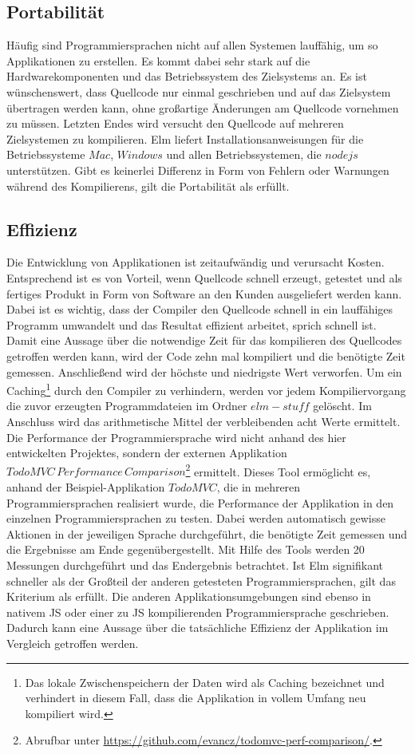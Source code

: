 \subsection{Portabilität}
\label{sec:muster_portabilitaet}
Häufig sind Programmiersprachen nicht auf allen Systemen lauffähig, um so Applikationen zu erstellen. Es kommt dabei sehr stark auf die Hardwarekomponenten und das Betriebssystem des Zielsystems an. Es ist wünschenswert, dass Quellcode nur einmal geschrieben und auf das Zielsystem übertragen werden kann, ohne großartige Änderungen am Quellcode vornehmen zu müssen. Letzten Endes wird versucht den Quellcode auf mehreren Zielsystemen zu kompilieren. Elm liefert Installationsanweisungen für die Betriebssysteme $Mac$, $Windows$ und allen Betriebssystemen, die $nodejs$ unterstützen. Gibt es keinerlei Differenz in Form von Fehlern oder Warnungen während des Kompilierens, gilt die Portabilität als erfüllt.


\subsection{Effizienz}
\label{sec:muster_effizienz}
Die Entwicklung von Applikationen ist zeitaufwändig und verursacht Kosten. Entsprechend ist es von Vorteil, wenn Quellcode schnell erzeugt, getestet und als fertiges Produkt in Form von Software an den Kunden ausgeliefert werden kann. Dabei ist es wichtig, dass der Compiler den Quellcode schnell in ein lauffähiges Programm umwandelt und das Resultat effizient arbeitet, sprich schnell ist. Damit eine Aussage über die notwendige Zeit für das kompilieren des Quellcodes getroffen werden kann, wird der Code zehn mal kompiliert und die benötigte Zeit gemessen. Anschließend wird der höchste und niedrigste Wert verworfen. Um ein Caching\footnote{Das lokale Zwischenspeichern der Daten wird als Caching bezeichnet und verhindert in diesem Fall, dass die Applikation in vollem Umfang neu kompiliert wird.} durch den Compiler zu verhindern, werden vor jedem Kompiliervorgang die zuvor erzeugten Programmdateien im Ordner $elm-stuff$ gelöscht. Im Anschluss wird das arithmetische Mittel der verbleibenden acht Werte ermittelt.
Die Performance der Programmiersprache wird nicht anhand des hier entwickelten Projektes, sondern der externen Applikation $TodoMVC\,Performance\,Comparison$\footnote{Abrufbar unter \url{https://github.com/evancz/todomvc-perf-comparison/}.} ermittelt. Dieses Tool ermöglicht es, anhand der Beispiel-Applikation $TodoMVC$, die in mehreren Programmiersprachen realisiert wurde, die Performance der Applikation in den einzelnen Programmiersprachen zu testen. Dabei werden automatisch gewisse Aktionen in der jeweiligen Sprache durchgeführt, die benötigte Zeit gemessen und die Ergebnisse am Ende gegenübergestellt. Mit Hilfe des Tools werden 20 Messungen durchgeführt und das Endergebnis betrachtet. Ist Elm signifikant schneller als der Großteil der anderen getesteten Programmiersprachen, gilt das Kriterium als erfüllt. Die anderen Applikationsumgebungen sind ebenso in nativem \ac{JS} oder einer zu \ac{JS} kompilierenden Programmiersprache geschrieben. Dadurch kann eine Aussage über die tatsächliche Effizienz der Applikation im Vergleich getroffen werden.



